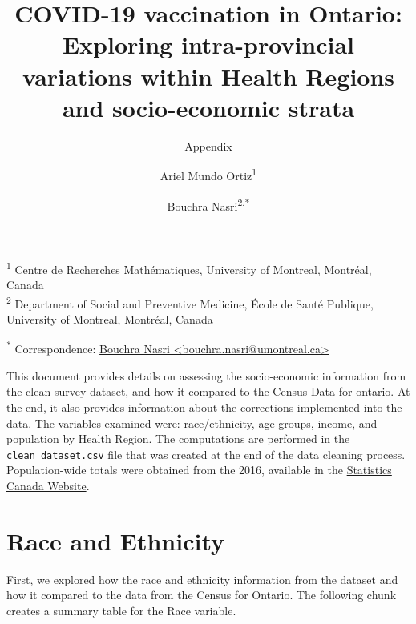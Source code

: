 \documentclass[
  letterpaper,
  DIV=11,
  numbers=noendperiod]{scrartcl}
\title{\textbf{COVID-19 vaccination in Ontario: Exploring
intra-provincial variations within Health Regions and socio-economic
strata}}
\subtitle{Appendix}
\author{Ariel Mundo Ortiz\textsuperscript{1} \and Bouchra
Nasri\textsuperscript{2,*}}
\date{}
\begin{document}
\maketitle
\setcounter{page}{1}
\renewcommand\thesection{A}
\renewcommand\thesubsection{\thesection.\arabic{subsection}}
\renewcommand{\thepage}{A-\arabic{page}}
\renewcommand{\thetable}{A-\arabic{table}}
\renewcommand\thefigure{\thesection-\arabic{figure}}


\ifdefined\Shaded\renewenvironment{Shaded}{\begin{tcolorbox}[borderline west={3pt}{0pt}{shadecolor}, interior hidden, frame hidden, breakable, sharp corners, boxrule=0pt, enhanced]}{\end{tcolorbox}}\fi

\textsuperscript{1} Centre de Recherches Mathématiques, University of
Montreal, Montréal, Canada\\
\textsuperscript{2} Department of Social and Preventive Medicine, École
de Santé Publique, University of Montreal, Montréal, Canada

\textsuperscript{*} Correspondence:
\href{mailto:bouchra.nasri@umontreal.ca}{Bouchra Nasri
\textless{}bouchra.nasri@umontreal.ca\textgreater{}}

This document provides details on assessing the socio-economic
information from the clean survey dataset, and how it compared to the
Census Data for ontario. At the end, it also provides information about
the corrections implemented into the data. The variables examined were:
race/ethnicity, age groups, income, and population by Health Region. The
computations are performed in the \texttt{clean\_dataset.csv} file that
was created at the end of the data cleaning process. Population-wide
totals were obtained from the 2016, available in the
\href{https://www12.statcan.gc.ca/census-recensement/2016/dp-pd/prof/details/Page.cfm?Lang=E\&Geo1=PR\&Code1=35\&Geo2=\&Code2=\&Data=Count\&SearchText=Ontario\&Sear}{Statistics
Canada Website}.

\hypertarget{race-and-ethnicity}{%
\section{Race and Ethnicity}\label{race-and-ethnicity}}

First, we explored how the race and ethnicity information from the
dataset and how it compared to the data from the Census for Ontario. The
following chunk creates a summary table for the Race variable.
\end{document}
